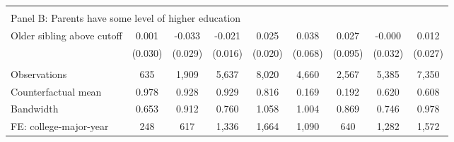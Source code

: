 {{\begin{tabular}{lcccccccc}
&  &  &  & & & & & &    \\
\multicolumn{9}{l}{Panel B: Parents have some level of higher education} \\
Older sibling above cutoff&       0.001   &      -0.033   &      -0.021   &       0.025   &       0.038   &       0.027   &      -0.000   &       0.012   \\
                    &     (0.030)   &     (0.029)   &     (0.016)   &     (0.020)   &     (0.068)   &     (0.095)   &     (0.032)   &     (0.027)   \\
                    &               &               &               &               &               &               &               &               \\
Observations        &         635   &       1,909   &       5,637   &       8,020   &       4,660   &       2,567   &       5,385   &       7,350   \\
Counterfactual mean &       0.978   &       0.928   &       0.929   &       0.816   &       0.169   &       0.192   &       0.620   &       0.608   \\
Bandwidth           &       0.653   &       0.912   &       0.760   &       1.058   &       1.004   &       0.869   &       0.746   &       0.978   \\
FE: college-major-year&         248   &         617   &       1,336   &       1,664   &       1,090   &         640   &       1,282   &       1,572   \\
 

\bottomrule
\end{tabular}
}
}
